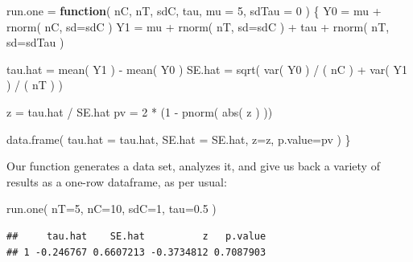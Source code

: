 \documentclass[
]{book}
\newenvironment{Shaded}{\begin{snugshade}}{\end{snugshade}}
\newcommand{\AttributeTok}[1]{\textcolor[rgb]{0.77,0.63,0.00}{#1}}
\newcommand{\ControlFlowTok}[1]{\textcolor[rgb]{0.13,0.29,0.53}{\textbf{#1}}}
\newcommand{\DecValTok}[1]{\textcolor[rgb]{0.00,0.00,0.81}{#1}}
\newcommand{\FloatTok}[1]{\textcolor[rgb]{0.00,0.00,0.81}{#1}}
\newcommand{\FunctionTok}[1]{\textcolor[rgb]{0.00,0.00,0.00}{#1}}
\newcommand{\NormalTok}[1]{#1}
\newcommand{\OtherTok}[1]{\textcolor[rgb]{0.56,0.35,0.01}{#1}}
\newcommand{\SpecialCharTok}[1]{\textcolor[rgb]{0.00,0.00,0.00}{#1}}
\begin{document}
\begin{Shaded}
\begin{Highlighting}[]
\NormalTok{run.one }\OtherTok{=} \ControlFlowTok{function}\NormalTok{( nC, nT, sdC, tau, }\AttributeTok{mu =} \DecValTok{5}\NormalTok{, }\AttributeTok{sdTau =} \DecValTok{0}\NormalTok{ ) \{}
\NormalTok{  Y0 }\OtherTok{=}\NormalTok{ mu }\SpecialCharTok{+} \FunctionTok{rnorm}\NormalTok{( nC, }\AttributeTok{sd=}\NormalTok{sdC )}
\NormalTok{  Y1 }\OtherTok{=}\NormalTok{ mu }\SpecialCharTok{+} \FunctionTok{rnorm}\NormalTok{( nT, }\AttributeTok{sd=}\NormalTok{sdC ) }\SpecialCharTok{+}\NormalTok{ tau }\SpecialCharTok{+} \FunctionTok{rnorm}\NormalTok{( nT, }\AttributeTok{sd=}\NormalTok{sdTau )}

\NormalTok{  tau.hat }\OtherTok{=} \FunctionTok{mean}\NormalTok{( Y1 ) }\SpecialCharTok{{-}} \FunctionTok{mean}\NormalTok{( Y0 )}
\NormalTok{  SE.hat }\OtherTok{=} \FunctionTok{sqrt}\NormalTok{( }\FunctionTok{var}\NormalTok{( Y0 ) }\SpecialCharTok{/}\NormalTok{ ( nC ) }\SpecialCharTok{+} \FunctionTok{var}\NormalTok{( Y1 ) }\SpecialCharTok{/}\NormalTok{ ( nT ) )}

\NormalTok{  z }\OtherTok{=}\NormalTok{ tau.hat }\SpecialCharTok{/}\NormalTok{ SE.hat}
\NormalTok{  pv }\OtherTok{=} \DecValTok{2} \SpecialCharTok{*}\NormalTok{ (}\DecValTok{1} \SpecialCharTok{{-}} \FunctionTok{pnorm}\NormalTok{( }\FunctionTok{abs}\NormalTok{( z ) ))}

  \FunctionTok{data.frame}\NormalTok{( }\AttributeTok{tau.hat =}\NormalTok{ tau.hat, }\AttributeTok{SE.hat =}\NormalTok{ SE.hat, }\AttributeTok{z=}\NormalTok{z, }\AttributeTok{p.value=}\NormalTok{pv )}
\NormalTok{\}}
\end{Highlighting}
\end{Shaded}

Our function generates a data set, analyzes it, and give us back a variety
of results as a one-row dataframe, as per usual:

\begin{Shaded}
\begin{Highlighting}[]
\FunctionTok{run.one}\NormalTok{( }\AttributeTok{nT=}\DecValTok{5}\NormalTok{, }\AttributeTok{nC=}\DecValTok{10}\NormalTok{, }\AttributeTok{sdC=}\DecValTok{1}\NormalTok{, }\AttributeTok{tau=}\FloatTok{0.5}\NormalTok{ )}
\end{Highlighting}
\end{Shaded}

\begin{verbatim}
##     tau.hat    SE.hat          z   p.value
## 1 -0.246767 0.6607213 -0.3734812 0.7087903
\end{verbatim}
\end{document}
